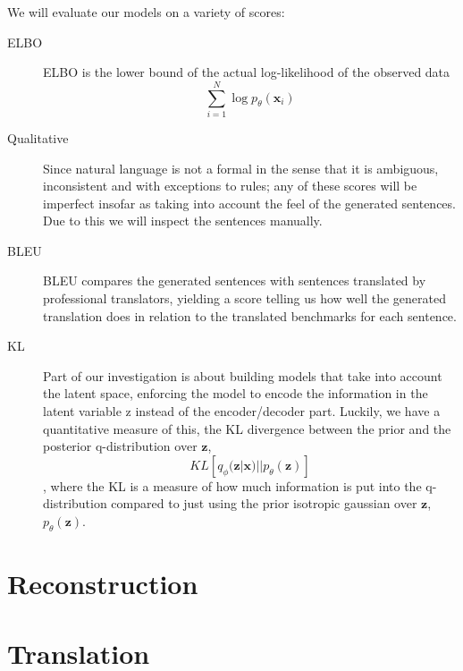 We will evaluate our models on a variety of scores:

\begin{description}
\item[ELBO] ELBO is the lower bound of the actual log-likelihood of the observed
  data
  \begin{equation*}
    \sum_{i=1}^{N} \log p_{\theta}(\bm{x}_i)
  \end{equation*}
\item[Qualitative] Since natural language is not a formal in the sense that it
  is ambiguous, inconsistent and with exceptions to rules; any of these scores
  will be imperfect insofar as taking into account the feel of the generated
  sentences. Due to this we will inspect the sentences manually.
\item[BLEU] BLEU compares the generated sentences with sentences translated by
  professional translators, yielding a score telling us how well the generated
  translation does in relation to the translated benchmarks for each sentence.
\item[KL] Part of our investigation is about building models that take into
  account the latent space, enforcing the model to encode the information in the
  latent variable z instead of the encoder/decoder part. Luckily, we have a
  quantitative measure of this, the KL divergence between the prior and the
  posterior q-distribution over $\bm{z}$,
  \begin{equation*}
    KL[q_{\phi}(\bm{z} | \bm{x}) || p_{\theta}(\bm{z})]
  \end{equation*}
  , where the KL is a measure of how much information is put into the
  q-distribution compared to just using the prior isotropic gaussian over
  $\bm{z}$, $p_{\theta}(\bm{z})$.
\end{description}

\section{Reconstruction}

\section{Translation}

